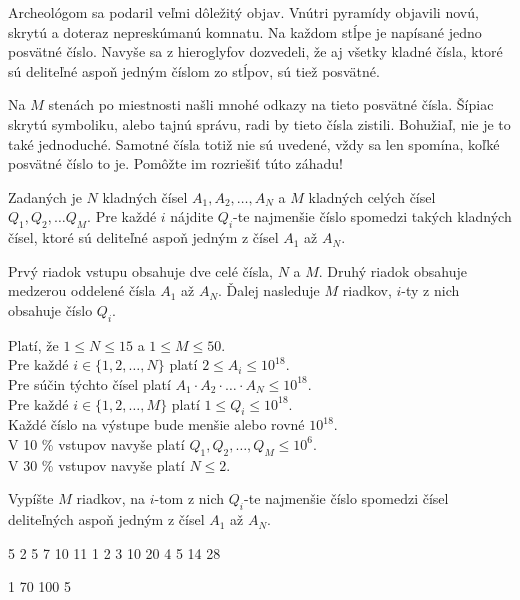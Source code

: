 
\usepackage[slovak]{babel}





Archeológom sa podaril veľmi dôležitý objav. Vnútri pyramídy objavili novú,
skrytú a doteraz nepreskúmanú komnatu. Na každom stĺpe je napísané jedno
posvätné číslo. Navyše sa z hieroglyfov dozvedeli, že aj všetky kladné čísla, ktoré
sú deliteľné aspoň jedným číslom zo stĺpov, sú tiež posvätné.

Na $M$ stenách po miestnosti našli mnohé odkazy na tieto posvätné čísla. Šípiac
skrytú symboliku, alebo tajnú správu, radi by tieto čísla zistili. Bohužiaľ, nie
je to také jednoduché. Samotné čísla totiž nie sú uvedené, vždy sa len spomína,
koľké posvätné číslo to je. Pomôžte im rozriešiť túto záhadu!


Zadaných je $N$ kladných čísel $A_1, A_2, \ldots, A_N$ a $M$ kladných celých čísel
$Q_1, Q_2, \ldots Q_M$. Pre každé $i$ nájdite $Q_i$-te najmenšie číslo spomedzi
takých kladných čísel, ktoré sú deliteľné aspoň jedným z čísel $A_1$ až $A_N$.


Prvý riadok vstupu obsahuje dve celé čísla, $N$ a $M$. Druhý riadok obsahuje
medzerou oddelené čísla $A_1$ až $A_N$. Ďalej nasleduje $M$ riadkov, $i$-ty z nich
obsahuje číslo $Q_i$.

\bigskip
\noindent
Platí, že $1 \leq N \leq 15$ a $1 \leq M \leq 50$.\\
Pre každé $i \in \{ 1, 2, \ldots, N \}$ platí $2 \leq A_i \leq 10^{18}$.\\
Pre súčin týchto čísel platí $A_1 \cdot A_2 \cdot \ldots \cdot A_N \leq 10^{18}$.\\
Pre každé $i \in \{ 1, 2, \ldots, M \}$ platí $1 \leq Q_i \leq 10^{18}$.\\
Každé číslo na výstupe bude menšie alebo rovné $10^{18}$.\\
V 10 \% vstupov navyše platí $Q_1, Q_2, \ldots, Q_M \leq 10^6$.\\
V 30 \% vstupov navyše platí $N \leq 2$.


Vypíšte $M$ riadkov, na $i$-tom z nich $Q_i$-te najmenšie číslo spomedzi
čísel deliteľných aspoň jedným z čísel $A_1$ až $A_N$.


 5
2 5 7 10 11
1
2
3
10
20
4
5
14
28
\sampleEND

 1
70 100
5
\sampleEND


